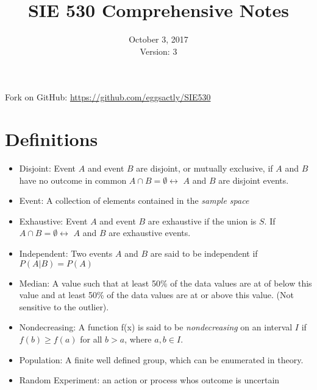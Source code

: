 \documentclass[12pt]{article}
\begin{document}
\title{SIE 530 Comprehensive Notes}
\date{October 3, 2017\\Version: 3}
\maketitle
{\centering

Fork on GitHub: \url{https://github.com/eggsactly/SIE530}\par
}
\section*{Definitions}

\begin{itemize}

\item Disjoint: Event $A$ and event $B$ are disjoint, or mutually exclusive, if $A$ and $B$ have no outcome in common $A \cap B = \emptyset \leftrightarrow$ $A$ and $B$ are disjoint events. \cite[p.18]{classnotes.1}

\item Event: A collection of elements contained in the \emph{sample space} \cite[p.16]{classnotes.1}

\item Exhaustive: Event $A$ and event $B$ are exhaustive if the union is $S$. If $A \cap B = \emptyset \leftrightarrow$ $A$ and $B$ are exhaustive events. \cite[p.18]{classnotes.1}

\item Independent: Two events $A$ and $B$ are said to be independent if $P(A|B)=P(A)$ \cite[p.8]{classnotes.3}

\item Median: A value such that at least 50\% of the data values are at of below this value and at least 50\% of the data values are at or above this value. (Not sensitive to the outlier). \cite[p.9]{classnotes.1}

\item Nondecreasing: A function f(x) is said to be \emph{nondecreasing} on an interval $I$ if $f(b)\geq f(a)$ for all $b>a$, where $a,b \in I$. \cite{wolfram.nondecreasing}

\item Population: A finite well defined group, which can be enumerated in theory. \cite[p.9]{classnotes.1}

\item Random Experiment: an action or process whos outcome is uncertain \cite[p.16]{classnotes.1}


\end{itemize}
\end{document}

